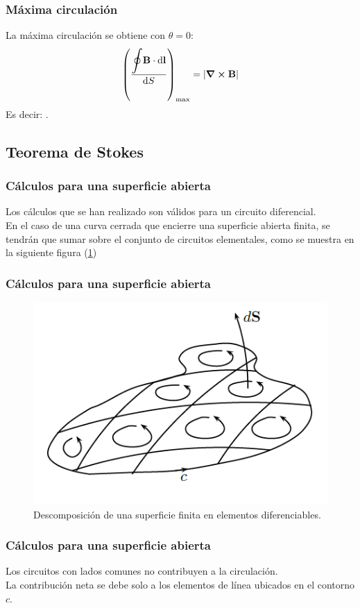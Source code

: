 \documentclass[12pt]{beamer}
\begin{document}
\begin{frame}
\frametitle{Máxima circulación}
La máxima circulación se obtiene con $\theta = 0$:
\pause
\begin{align*}
\left( \dfrac{\displaystyle \scaleoint{6ex} \vb{B} \cdot \dd{\vb{l}}}{\dd{S}} \right)_{\max} = \abs{\curl{\vb{B}}}
\end{align*}
Es decir: .
\end{frame}

\subsection{Teorema de Stokes}

\begin{frame}
\frametitle{Cálculos para una superficie abierta}
Los cálculos que se han realizado son válidos para un circuito diferencial.
\\
\bigskip
\pause
En el caso de una curva cerrada que encierre una superficie abierta finita, se tendrán que sumar sobre el conjunto de circuitos elementales, como se muestra en la siguiente figura (\ref{fig:figura_superficie_elementos_diferenciables})
\end{frame}
\begin{frame}
\frametitle{Cálculos para una superficie abierta}
\begin{figure}[h!]
    \centering
    \includegraphics[scale=0.6]{Imagenes/Superficie_Elementos_Diferenciables.png}
    \caption{Descomposición de una superficie finita en elementos diferenciables.}
    \label{fig:figura_superficie_elementos_diferenciables}
\end{figure}
\end{frame}
\begin{frame}
\frametitle{Cálculos para una superficie abierta}
Los circuitos con lados comunes no contribuyen a la circulación.
\\
\bigskip
\pause
La contribución neta se debe solo a los elementos de línea ubicados en el contorno $c$.
\end{frame}
\end{document}
